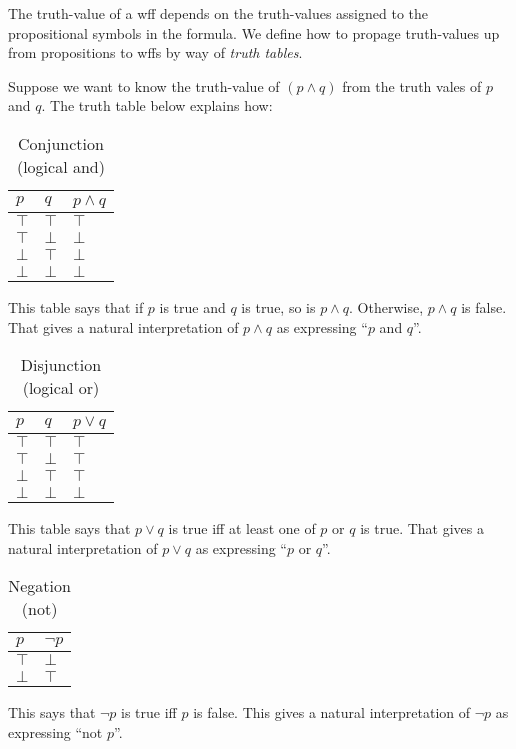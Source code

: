 \documentclass[12pt]{article}
\begin{document}
The truth-value of a wff depends on the truth-values assigned to the propositional symbols in the formula. We define how to propage truth-values up from propositions to wffs by way of \emph{truth tables}.

Suppose we want to know the truth-value of $(p \land q)$ from the truth vales of $p$ and $q$. The truth table below explains how:

\begin{table}[h!]
\centering
\caption{Conjunction (logical and)}
\begin{tabular}{l|l|l}
$p$    & $q$    & $p \land q$ \\ \hline
$\top$ & $\top$ &  $\top$     \\
$\top$ & $\bot$ &  $\bot$   \\
$\bot$ & $\top$ &  $\bot$   \\
$\bot$ & $\bot$ &  $\bot$   
\end{tabular}
\end{table}
This table says that if $p$ is true and $q$ is true, so is $p \land q$. Otherwise, $p \land q$ is false. That gives a natural interpretation of $p \land q$ as expressing ``$p$ and $q$''.

\begin{table}[h!]
\centering
\caption{Disjunction (logical or)}
\begin{tabular}{l|l|l}
$p$    & $q$    & $p \vee q$ \\ \hline
$\top$ & $\top$ & $\top$      \\
$\top$ & $\bot$ & $\top$    \\
$\bot$ & $\top$ & $\top$    \\
$\bot$ & $\bot$ & $\bot$    
\end{tabular}
\end{table}
This table says that $p \vee q$ is true iff at least one of $p$ or $q$ is true. That gives a natural interpretation of $p \vee q$ as expressing ``$p$ or $q$''.

\begin{table}[h!]
\centering
\caption{Negation (not)}
\label{my-label}
\begin{tabular}{l|l}
$p$     & $\lnot p$ \\ \hline 
$\top$  & $\bot$      \\
$\bot$  & $\top$    \\
\end{tabular}
\end{table}
This says that $\lnot p$ is true iff $p$ is false. This gives a natural interpretation of $\lnot p$ as expressing ``not $p$''.  
\end{document}
